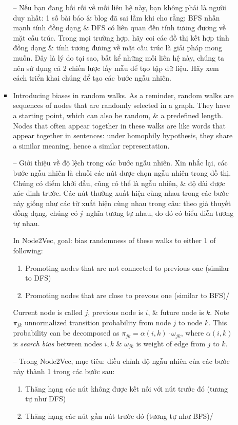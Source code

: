 \documentclass{article}
\begin{document}
\begin{itemize}
\begin{itemize}
\begin{itemize}
            -- Nếu bạn đang bối rối về mối liên hệ này, bạn không phải là người duy nhất: 1 số bài báo \& blog đã sai lầm khi cho rằng: BFS nhấn mạnh tính đồng dạng \& DFS có liên quan đến tính tương đương về mặt cấu trúc. Trong mọi trường hợp, hãy coi các đồ thị kết hợp tính đồng dạng \& tính tương đương về mặt cấu trúc là giải pháp mong muốn. Đây là lý do tại sao, bất kể những mối liên hệ này, chúng ta nên sử dụng cả 2 chiến lược lấy mẫu để tạo tập dữ liệu. Hãy xem cách triển khai chúng để tạo các bước ngẫu nhiên.
            \item {\sf Introducing biases in random walks.} As a reminder, random walks are sequences of nodes that are randomly selected in a graph. They have a starting point, which can also be random, \& a predefined length. Nodes that often appear together in these walks are like words that appear together in sentences: under homophily hypothesis, they share a similar meaning, hence a similar representation.

            -- {\sf Giới thiệu về độ lệch trong các bước ngẫu nhiên.} Xin nhắc lại, các bước ngẫu nhiên là chuỗi các nút được chọn ngẫu nhiên trong đồ thị. Chúng có điểm khởi đầu, cũng có thể là ngẫu nhiên, \& độ dài được xác định trước. Các nút thường xuất hiện cùng nhau trong các bước này giống như các từ xuất hiện cùng nhau trong câu: theo giả thuyết đồng dạng, chúng có ý nghĩa tương tự nhau, do đó có biểu diễn tương tự nhau.

            In Node2Vec, goal: bias randomness of these walks to either 1 of following:
            \begin{enumerate}
                \item Promoting nodes that are not connected to previous one (similar to DFS)
                \item Promoting nodes that are close to prevous one (similar to BFS)/
            \end{enumerate}
            Current node is called $j$, previous node is $i$, \& future node is $k$. Note $\pi_{jk}$ unnormalized transition probability from node $j$ to node $k$. This probability can be decomposed as $\pi_{jk} = \alpha(i,k)\cdot\omega_{jk}$, where $\alpha(i,k)$ is {\it search bias} between nodes $i,k$ \& $\omega_{jk}$ is weight of edge from $j$ to $k$.

            -- Trong Node2Vec, mục tiêu: điều chỉnh độ ngẫu nhiên của các bước này thành 1 trong các bước sau:
            \begin{enumerate}
                \item Thăng hạng các nút không được kết nối với nút trước đó (tương tự như DFS)
                \item Thăng hạng các nút gần nút trước đó (tương tự như BFS)/


\end{enumerate}
\end{itemize}
\end{itemize}
\end{itemize}
\end{document}
